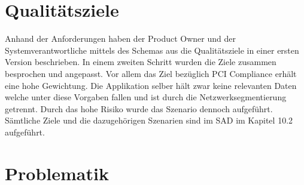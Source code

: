 \section{Qualitätsziele}

Anhand der Anforderungen haben der Product Owner und der Systemverantwortliche mittels des Schemas aus \cite[p.305-311]{esa} die Qualitätsziele in einer ersten Version beschrieben. In einem zweiten Schritt wurden die Ziele zusammen besprochen und angepasst. Vor allem das Ziel bezüglich PCI Compliance erhält eine hohe Gewichtung. Die Applikation selber hält zwar keine relevanten Daten welche unter diese Vorgaben fallen und ist durch die Netzwerksegmentierung getrennt. Durch das hohe Risiko wurde das Szenario dennoch aufgeführt. Sämtliche Ziele und die dazugehörigen Szenarien sind im SAD im Kapitel 10.2 aufgeführt.

\section{Problematik}


